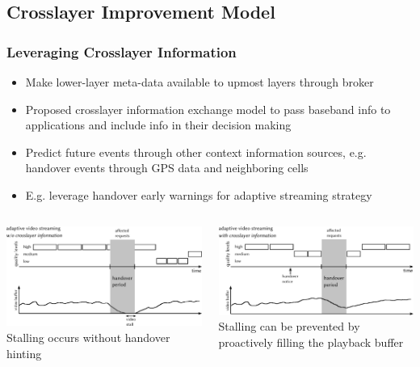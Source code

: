 \documentclass{beamer}
\begin{document}
\subsection{Crosslayer Improvement Model}


\begin{frame}
	\frametitle{Leveraging Crosslayer Information}

	\begin{itemize}
		\item Make lower-layer meta-data available to upmost layers through broker
		\item Proposed crosslayer information exchange model to pass baseband info to applications and include info in their decision making
		\item Predict future events through other context information sources, e.g. handover events through GPS data and neighboring cells
		\item E.g. leverage handover early warnings for adaptive streaming strategy 
	\end{itemize}

	\begin{columns}[T]
			\centering
			\includegraphics[width=\columnwidth]{../../chapters/05-mobilestreaming/images/adaptive-streaming-no-cl.pdf}\\
			Stalling occurs without handover hinting

			\centering
			\includegraphics[width=\columnwidth]{../../chapters/05-mobilestreaming/images/adaptive-streaming-cl.pdf}\\
			Stalling can be prevented by proactively filling the playback buffer
	\end{columns}
\end{frame}
\end{document}
